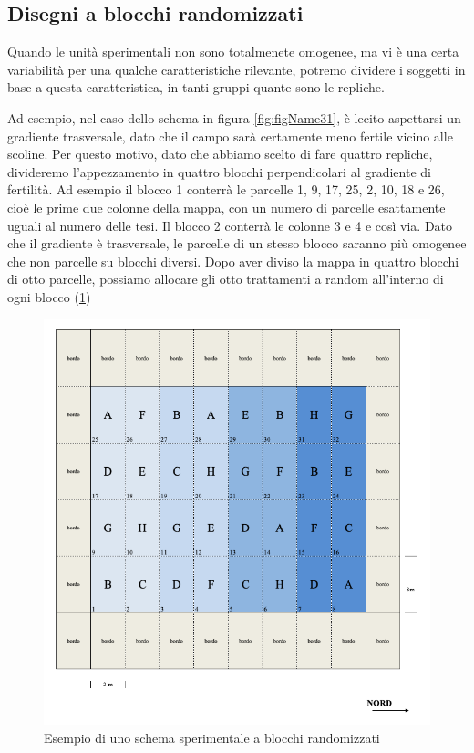 \documentclass[a4paper,12pt,oneside]{book}
\theoremstyle{definition}
\theoremstyle{definition}
\theoremstyle{definition}
\theoremstyle{remark}
\begin{document}
\subsection{Disegni a blocchi
randomizzati}\label{disegni-a-blocchi-randomizzati}

Quando le unità sperimentali non sono totalmenete omogenee, ma vi è una
certa variabilità per una qualche caratteristiche rilevante, potremo
dividere i soggetti in base a questa caratteristica, in tanti gruppi
quante sono le repliche.

Ad esempio, nel caso dello schema in figura \ref{fig:figName31}, è
lecito aspettarsi un gradiente trasversale, dato che il campo sarà
certamente meno fertile vicino alle scoline. Per questo motivo, dato che
abbiamo scelto di fare quattro repliche, divideremo l'appezzamento in
quattro blocchi perpendicolari al gradiente di fertilità. Ad esempio il
blocco 1 conterrà le parcelle 1, 9, 17, 25, 2, 10, 18 e 26, cioè le
prime due colonne della mappa, con un numero di parcelle esattamente
uguali al numero delle tesi. Il blocco 2 conterrà le colonne 3 e 4 e
così via. Dato che il gradiente è trasversale, le parcelle di un stesso
blocco saranno più omogenee che non parcelle su blocchi diversi. Dopo
aver diviso la mappa in quattro blocchi di otto parcelle, possiamo
allocare gli otto trattamenti a random all'interno di ogni blocco
(\ref{fig:figName34})

\begin{figure}

{\centering \includegraphics[width=0.9\linewidth]{_images/Mappa1CRBD} 

}

\caption{Esempio di uno schema sperimentale a blocchi randomizzati}\label{fig:figName34}
\end{figure}
\end{document}
